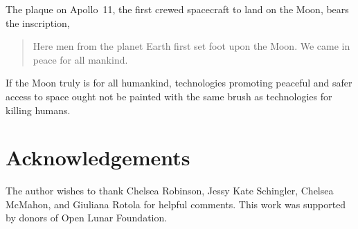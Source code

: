 \documentclass[preprint,twocolumn,5p]{elsarticle}
\begin{document}

The plaque on Apollo~11, the first crewed spacecraft to land on the Moon, bears the inscription,
\begin{quote}Here men from the planet Earth first set foot upon the Moon. We came in peace for all mankind.\end{quote} If the Moon truly is for all humankind, technologies promoting peaceful and safer access to space ought not be painted with the same brush as technologies for killing humans.

\section{Acknowledgements}
The author wishes to thank Chelsea Robinson, Jessy Kate Schingler, Chelsea McMahon, and Giuliana Rotola for helpful comments. This work was supported by donors of Open Lunar Foundation.

%
%   
\end{document}
